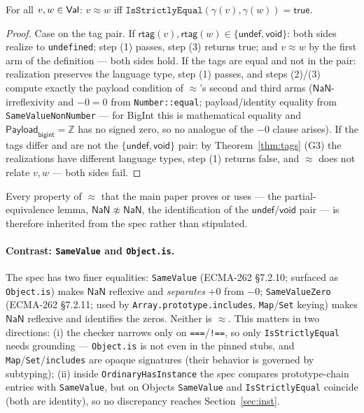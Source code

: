 \documentclass[11pt]{article}
\newcommand{\Payload}{\mathsf{Payload}}
\newcommand{\rtag}{\mathsf{rtag}}
\newcommand{\realize}{\gamma}
\newcommand{\ecma}[1]{ECMA-262 \S#1}
\begin{document}
\begin{theorem}
\label{thm:seq}
For all $v, w \in \mathsf{Val}$:
$v \approx w$ iff
$\texttt{IsStrictlyEqual}(\realize(v), \realize(w)) = \textsf{true}$.
\end{theorem}
\begin{proof}
Case on the tag pair. If $\rtag(v), \rtag(w) \in
\{\mathsf{undef},\mathsf{void}\}$: both sides realize to
\texttt{undefined}; step (1) passes, step (3) returns \textsf{true}; and
$v \approx w$ by the first arm of the definition — both sides hold. If
the tags are equal and not in the pair: realization preserves the
language type, step (1) passes, and steps (2)/(3) compute exactly the
payload condition of $\approx$'s second and third arms
($\mathsf{NaN}$-irreflexivity and $-0 = 0$ from
\texttt{Number::equal}; payload/identity equality from
\texttt{SameValueNonNumber} — for BigInt this is mathematical equality
and $\Payload_{\mathsf{bigint}} = \mathbb{Z}$ has no signed zero, so no
analogue of the $-0$ clause arises). If the tags differ and are not the
$\{\mathsf{undef},\mathsf{void}\}$ pair: by Theorem~\ref{thm:tags} (G3)
the realizations have different language types, step (1) returns
\textsf{false}, and $\approx$ does not relate $v, w$ — both sides fail.
\end{proof}

Every property of $\approx$ that the main paper proves or uses —
the partial-equivalence lemma, $\mathsf{NaN} \not\approx \mathsf{NaN}$,
the identification of the $\mathsf{undef}/\mathsf{void}$ pair — is
therefore inherited from the spec rather than stipulated.

\paragraph{Contrast: \texttt{SameValue} and \texttt{Object.is}.}
The spec has two finer equalities: \texttt{SameValue}
(\ecma{7.2.10}; surfaced as \texttt{Object.is}) makes $\mathsf{NaN}$
reflexive and \emph{separates} $+0$ from $-0$; \texttt{SameValueZero}
(\ecma{7.2.11}; used by \texttt{Array.prototype.includes},
\texttt{Map}/\texttt{Set} keying) makes $\mathsf{NaN}$ reflexive and
identifies the zeros. Neither is $\approx$. This matters in two
directions: (i) the checker narrows only on \texttt{===}/\texttt{!==},
so only \texttt{IsStrictlyEqual} needs grounding —
\texttt{Object.is} is not even in the pinned stubs, and
\texttt{Map}/\texttt{Set}/\texttt{includes} are opaque signatures (their
behavior is governed by subtyping); (ii) inside \texttt{OrdinaryHasInstance} the spec
compares prototype-chain entries with \texttt{SameValue}, but on Objects
\texttt{SameValue} and \texttt{IsStrictlyEqual} coincide (both are
identity), so no discrepancy reaches Section~\ref{sec:inst}.
\end{document}
